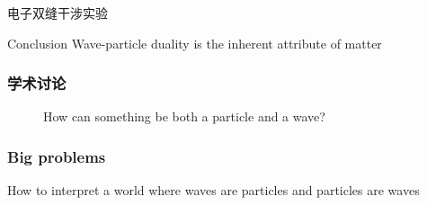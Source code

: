 \begin{frame}{电子双缝干涉实验}
\end{frame}

\begin{frame}  
    \begin{tcolorbox1}{Conclusion}
    Wave-particle duality is the inherent attribute of matter
    \end{tcolorbox1} 
\end{frame}

\begin{frame}
    \frametitle{学术讨论}
        \begin{figure}
            \centering
            \caption{{\color{red} How can something be both a particle and a wave?}} %
        \end{figure}
\end{frame}

\begin{frame}  
    \frametitle{Big problems} 
  \begin{center}
    How to interpret a world where waves are particles and particles are waves
  \end{center} 
\end{frame}


